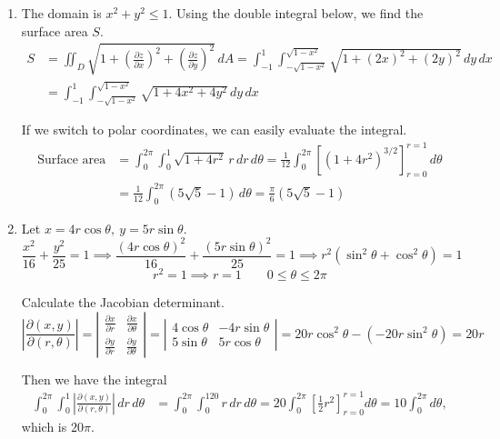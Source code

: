 \documentclass[a4paper, 12pt]{article}
\begin{document}
\begin{enumerate}[leftmargin=*,label=\textbf{\arabic*.}]
\item The domain is $x^2+y^2\leq1$. Using the double integral below, we find the surface area $S$.
\begin{align*}
S&=\iint_D\sqrt{1+\left(\frac{\partial z}{\partial x}\right)^2 +\left(\frac{\partial z}{\partial y}\right)^2}\,dA=\int_{-1}^1\int_{-\sqrt{1-x^2}}^{\sqrt{1-x^2}}\sqrt{1+\left(2x\right)^2 +\left(2y\right)^2}\,dy\,dx\\[1em]&=\int_{-1}^1\int_{-\sqrt{1-x^2}}^{\sqrt{1-x^2}}\sqrt{1+4x^2+4y^2}\,dy\,dx
\end{align*}

If we switch to polar coordinates, we can easily evaluate the integral.
\begin{align*}\text{Surface area}&=\int_0^{2\pi}\int_0^1\sqrt{1+4r^2}\,r\,dr\,d\theta=\frac1{12}\int_0^{2\pi}\left[\left(1+4r^2\right)^{3/2}\right]_{r=0}^{r=1}\,d\theta\\[1em]&=\frac1{12}\int_0^{2\pi}\left(5\sqrt5-1\right)\,d\theta=\boxed{\frac\pi6\left(5\sqrt5-1\right)}\end{align*}

\item Let $x=4r\cos\theta,\:y=5r\sin\theta$.
\[\frac{x^2}{16}+\frac{y^2}{25}=1\implies\frac{(4r\cos\theta)^2}{16}+\frac{(5r\sin\theta)^2}{25}=1\implies r^2\left(\sin^2\theta+\cos^2\theta\right)=1\]
\[r^2=1\implies r=1\quad\quad0\leq\theta\leq2\pi\]

\newpage
Calculate the Jacobian determinant.
\[
\left|\frac{\partial(x,y)}{\partial(r,\theta)}\right|=\left|\begin{array}{cc}
\displaystyle\frac{\partial x}{\partial r}&\displaystyle\frac{\partial x}{\partial\theta}\\[1em]
\displaystyle\frac{\partial y}{\partial r}&\displaystyle\frac{\partial y}{\partial\theta}
\end{array}\right|=\left|\begin{array}{cc}
4\cos\theta&-4r\sin\theta\\
5\sin\theta&5r\cos\theta
\end{array}\right|=20r\cos^2\theta-\left(-20r\sin^2\theta\right)=20r
\]

Then we have the integral
\begin{align*}\int_0^{2\pi}\int_0^1\left|\frac{\partial(x,y)}{\partial(r,\theta)}\right|\,dr\,d\theta&=\int_0^{2\pi}\int_0^120r\,dr\,d\theta=20\int_0^{2\pi}\left[\frac12r^2\right]_{r=0}^{r=1}d\theta=10\int_0^{2\pi}d\theta,\end{align*}
which is $\boxed{20\pi}$.


\end{enumerate}
\end{document}
